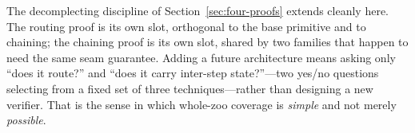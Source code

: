 The decomplecting discipline of Section~\ref{sec:four-proofs} extends cleanly here. The
routing proof is its own slot, orthogonal to the base primitive and to chaining; the
chaining proof is its own slot, shared by two families that happen to need the same seam
guarantee. Adding a future architecture means asking only ``does it route?'' and ``does it
carry inter-step state?''---two yes/no questions selecting from a fixed set of three
techniques---rather than designing a new verifier. That is the sense in which whole-zoo
coverage is \emph{simple} and not merely \emph{possible}.
